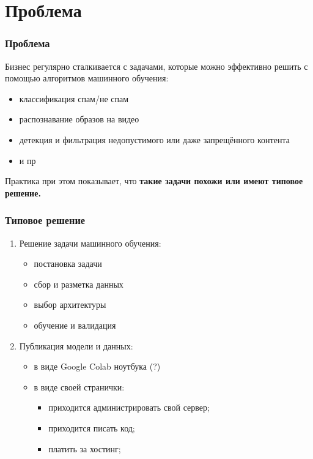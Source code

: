 \section{Проблема}
\begin{frame}
\frametitle{Проблема}
Бизнес регулярно сталкивается с задачами, которые можно эффективно решить с помощью алгоритмов машинного обучения:
\begin{itemize}
    \item классификация спам/не спам
    \item распознавание образов на видео
    \item детекция и фильтрация недопустимого или даже запрещённого контента
    \item и пр
\end{itemize}

Практика при этом показывает, что \textbf{такие задачи похожи или имеют типовое решение.}
\end{frame}

\begin{frame}
\frametitle{Типовое решение}
\begin{enumerate}
    \item Решение задачи машинного обучения:
    \begin{itemize}
        \item постановка задачи
        \item сбор и разметка данных
        \item выбор архитектуры
        \item обучение и валидация
    \end{itemize}
    \item Публикация модели и данных:
    \begin{itemize}
        \item в виде Google Colab ноутбука (?)
        \item в виде своей странички:
        \begin{itemize}
            \item приходится администрировать свой сервер;
            \item приходится писать код;
            \item платить за хостинг;
        \end{itemize}
    \end{itemize}
\end{enumerate}
\end{frame}

